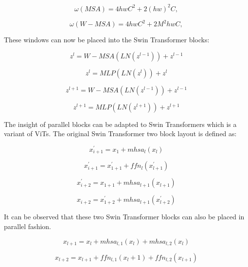 \documentclass[10pt,twocolumn,letterpaper]{article}
\begin{document}
\begin{equation}
\omega(MSA) = 4hwC^2 + 2(hw)^2C,
\end{equation}

\begin{equation}
\omega(W-MSA) = 4hwC^2 + 2M^2hwC,
\end{equation}

These windows can now be placed into the Swin Transformer blocks:

\begin{equation}
z^{l} = W-MSA (LN(z^{l-1})) + z^{l-1}
\end{equation}

\begin{equation}
z^{l} = MLP (LN(z^{l})) + z^{l}
\end{equation}

\begin{equation}
z^{l+1} = W-MSA (LN(z^{l-1})) + z^{l-1}
\end{equation}

\begin{equation}
z^{l+1} = MLP (LN(z^{l+1})) + z^{l+1}
\end{equation}

The insight of parallel blocks can be adapted to Swin Transformers\cite{liu2021swin} which is a variant of ViTs. The original Swin Transformer two block layout is defined as:

\begin{equation}
x^{'}_{i+1} = x_1 + mhsa_l(x_l)
\end{equation}

\begin{equation}
x^{'}_{i+1} = x^{'}_{1+1} + ffn_l(x^{'}_{l+1})
\end{equation}

\begin{equation}
x^{'}_{i+2} = x_{1+1} + mhsa_{l+1}(x_{l+1})
\end{equation}

\begin{equation}
x_{i+2} = x^{'}_{1+2} + mhsa_{l+1}(x^{'}_{l+2})
\end{equation}

It can be observed that these two Swin Transformer blocks can also be placed in parallel fashion.

\begin{equation}
x_{l+1} = x_{l} + mhsa_{l,1}(x_l) + mhsa_{l,2}(x_l)
\end{equation}

\begin{equation}
x_{l+2} = x_{l+1} + ffn_{l,1}(x_l+1) + ffn_{l,2}(x_{l+1})
\end{equation}
\end{document}
